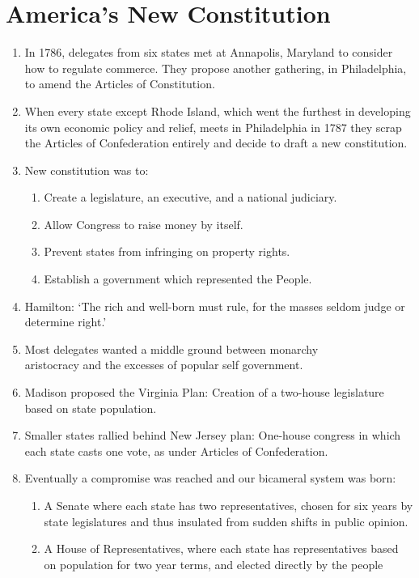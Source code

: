 \documentclass{article}
\begin{document}
  \section{America's New Constitution}
    \begin{enumerate}
      \item In 1786, delegates from six states met at Annapolis, Maryland to consider how to regulate commerce. They propose another gathering, in Philadelphia, to amend the Articles of Constitution.
      \item When every state except Rhode Island, which went the furthest in developing its own economic policy and relief, meets in Philadelphia in 1787 they scrap the Articles of Confederation entirely and decide to draft a new constitution.
      \item New constitution was to:
        \begin{enumerate}
          \item Create a legislature, an executive, and a national judiciary. 
          \item Allow Congress to raise money by itself.
          \item Prevent states from infringing on property rights.
          \item Establish a government which represented the People. 
        \end{enumerate}
      \item Hamilton: `The rich and well-born must rule, for the masses seldom judge or determine right.'
      \item Most delegates wanted a middle ground between monarchy\\aristocracy and the excesses of popular self government.
      \item Madison proposed the Virginia Plan: Creation of a two-house legislature based on state population.
      \item Smaller states rallied behind New Jersey plan: One-house congress in which each state casts one vote, as under Articles of Confederation.
      \item Eventually a compromise was reached and our bicameral system was born:
        \begin{enumerate}
          \item A Senate where each state has two representatives, chosen for six years by state legislatures and thus insulated from sudden shifts in public opinion.
          \item A House of Representatives, where each state has representatives based on population for two year terms, and elected directly by the people

\end{enumerate}
\end{enumerate}
\end{document}
